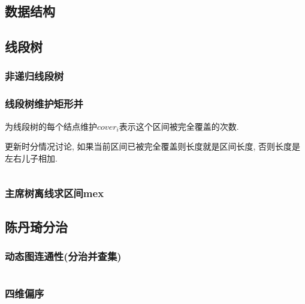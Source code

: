 \documentclass[a4paper, twoside]{article}
\begin{document}
\begin{multicols}{2}


			

		\section{数据结构}

			\subsection{线段树}
				\subsubsection{非递归线段树}
					
				
				\subsubsection{线段树维护矩形并}
					为线段树的每个结点维护$cover_i$表示这个区间被完全覆盖的次数.

					更新时分情况讨论, 如果当前区间已被完全覆盖则长度就是区间长度, 否则长度是左右儿子相加.
					\inputminted{cpp}{../src/datastructure/线段树维护矩形并.cpp}

				\subsubsection{主席树离线求区间mex}
					
	
			\subsection{陈丹琦分治}
				\subsubsection{动态图连通性(分治并查集)}
					\inputminted{cpp}{../src/datastructure/分治并查集.cpp}

				\subsubsection{四维偏序}
					\inputminted{cpp}{../src/datastructure/CDQ分治.cpp}
	

\end{multicols}
\end{document}
